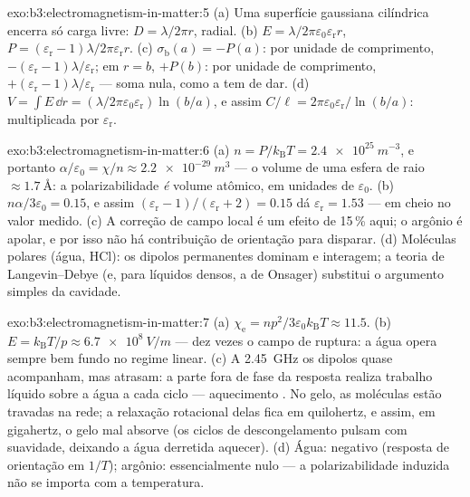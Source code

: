 \begin{solution}{exo:b3:electromagnetism-in-matter:5}
(a) Uma superfície gaussiana cilíndrica encerra só carga livre:
$D = \lambda/2\pi r$, radial. (b) $E =
\lambda/2\pi\varepsilon_0\varepsilon_{\text{r}}r$, $P =
(\varepsilon_{\text{r}}-1)\lambda/2\pi\varepsilon_{\text{r}}r$.
(c) $\sigma_{\text{b}}(a) = -P(a)$: por unidade de comprimento,
$-(\varepsilon_{\text{r}}-1)\lambda/\varepsilon_{\text{r}}$;
em $r = b$, $+P(b)$: por unidade de comprimento,
$+(\varepsilon_{\text{r}}-1)\lambda/\varepsilon_{\text{r}}$ ---
soma nula, como a  tem de dar. (d) $V = \int E\,\dd r =
(\lambda/2\pi\varepsilon_0\varepsilon_{\text{r}})\ln(b/a)$, e assim
$C/\ell = 2\pi\varepsilon_0\varepsilon_{\text{r}}/\ln(b/a)$:
multiplicada por $\varepsilon_{\text{r}}$.
\end{solution}

\begin{solution}{exo:b3:electromagnetism-in-matter:6}
(a) $n = P/k_{\text{B}}T = \qty{2.4e25}{m^{-3}}$, e portanto
$\alpha/\varepsilon_0 = \chi/n \approx \qty{2.2e-29}{m^3}$ ---
o volume de uma esfera de raio $\approx\qty{1.7}{\angstrom}$:
a polarizabilidade \emph{é} volume atômico, em unidades de $\varepsilon_0$.
(b) $n\alpha/3\varepsilon_0 = 0.15$, e assim $(\varepsilon_{\text{r}} -
1)/(\varepsilon_{\text{r}} + 2) = 0.15$ dá
$\varepsilon_{\text{r}} = 1.53$ --- em cheio no valor medido.
(c) A correção de campo local é um efeito de 15\,\% aqui; o argônio é
apolar, e por isso não há contribuição de orientação para disparar. (d)
Moléculas polares (água, HCl): os dipolos permanentes dominam e
interagem; a teoria de Langevin--Debye (e, para líquidos densos, a de
Onsager) substitui o argumento simples da cavidade.
\end{solution}

\begin{solution}{exo:b3:electromagnetism-in-matter:7}
(a) $\chi_{\text{e}} = np^2/3\varepsilon_0k_{\text{B}}T \approx
11.5$. (b) $E = k_{\text{B}}T/p \approx \qty{6.7e8}{V/m}$ ---
dez vezes o campo de ruptura: a água opera sempre bem fundo no
regime linear. (c) A \qty{2.45}{GHz} os dipolos quase acompanham,
mas atrasam: a parte fora de fase da resposta realiza trabalho líquido
sobre a água a cada ciclo --- aquecimento . No gelo, as
moléculas estão travadas na rede; a relaxação rotacional delas fica em
quilohertz, e assim, em gigahertz, o gelo mal absorve (os ciclos de
descongelamento pulsam com suavidade, deixando a água derretida aquecer).
(d) Água: negativo (resposta de orientação em $1/T$); argônio:
essencialmente nulo --- a polarizabilidade induzida não se importa com a temperatura.
\end{solution}

